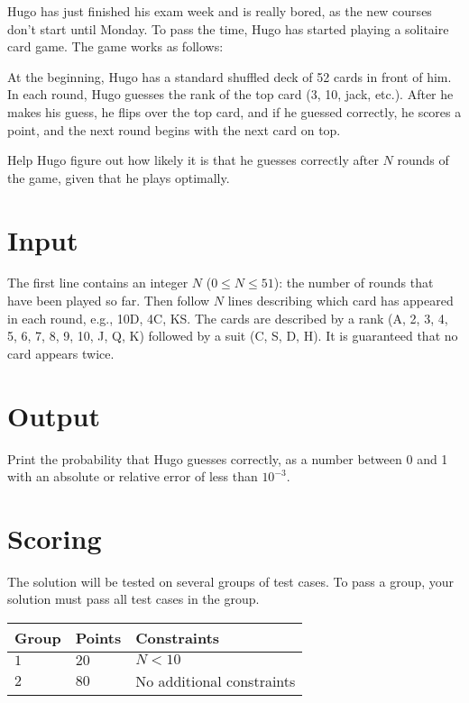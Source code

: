 Hugo has just finished his exam week and is really bored, as the new courses don't start until Monday.
To pass the time, Hugo has started playing a solitaire card game. The game works as follows:

At the beginning, Hugo has a standard shuffled deck of 52 cards in front of him. In each round, Hugo guesses the rank of the top card (3, 10, jack, etc.).
After he makes his guess, he flips over the top card, and if he guessed correctly, he scores a point, and the next round begins with the next card on top.

Help Hugo figure out how likely it is that he guesses correctly after $N$ rounds of the game, given that he plays optimally.

\section*{Input}
The first line contains an integer $N$ ($0 \le N \le 51$): the number of rounds that have been played so far.
Then follow $N$ lines describing which card has appeared in each round, e.g., 10D, 4C, KS.
The cards are described by a rank (A, 2, 3, 4, 5, 6, 7, 8, 9, 10, J, Q, K) followed by a suit (C, S, D, H).
It is guaranteed that no card appears twice.

\section*{Output}
Print the probability that Hugo guesses correctly, as a number between 0 and 1 with an absolute or relative error of less than $10^{-3}$.

\section*{Scoring}
The solution will be tested on several groups of test cases. To pass a group, your solution must
pass all test cases in the group.

\noindent
\begin{tabular}{| l | l | p{12cm} |}
  \hline
  \textbf{Group} & \textbf{Points} & \textbf{Constraints} \\ \hline
  $1$    & $20$       & $N < 10$ \\ \hline
  $2$    & $80$       & No additional constraints \\ \hline
\end{tabular}
